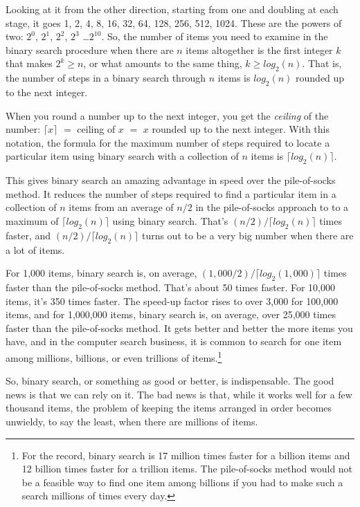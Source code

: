Looking at it from the other direction, starting from one
and doubling at each stage, it goes 1, 2, 4, 8, 16, 32, 64,
128, 256, 512, 1024. These are the powers of two:
$2^0$, $2^1$, $2^2$, $2^3$ \dots $2^{10}$.
So, the number of items you need to examine
in the binary search procedure
when there are $n$ items altogether is the
first integer $k$ that makes $2^k \geq n$, or
what amounts to the same thing, $k \geq log_2(n)$.
That is, the number of steps in a
binary search through
$n$ items is $log_2(n)$ rounded up
to the next integer.

When you round a number up to the next integer, you get the
\emph{ceiling}
of the number:
$\lceil x \rceil$ $=$ ceiling of $x$ $=$ $x$ rounded up to the next integer.
With this notation, the formula for the maximum number of steps
required to locate a particular item using
binary search with a collection of $n$ items
is $\lceil log_2(n) \rceil$.

This gives binary search an amazing
advantage in speed over the pile-of-socks method.
It reduces the number of steps required to find a particular item
in a collection of $n$ items from an average of $n/2$
in the pile-of-socks approach to
to a maximum of $\lceil log_2(n) \rceil$
using binary search.
That's $(n/2)/\lceil log_2(n) \rceil$ times faster,
and $(n/2)/\lceil log_2(n) \rceil$ turns
out to be a very big number when there are a lot of items.

For 1,000 items,
binary search is, on average,
$(1,000/2)/\lceil log_2(1,000) \rceil$ times faster than the pile-of-socks method.
That's about 50 times faster.
For 10,000 items, it's 350 times faster.
The speed-up factor rises to over 3,000 for 100,000 items,
and for 1,000,000 items, binary search is, on average,
over 25,000 times faster than the pile-of-socks method.
It gets better and better the more items you have,
and in the computer search business, it is common to search for one item among
millions, billions, or even trillions of items.\footnote{For the record,
binary search is 17 million times faster for a billion items
and 12 billion times faster for a trillion items.
The pile-of-socks method would not be a feasible way
to find one item among billions if you had to make such a search
millions of times every day.}

So, binary search, or something as good or better, is indispensable.
The good news is that we can rely on it.
The bad news is that, while it works
well for a few thousand items, the problem of
keeping the items arranged in order
becomes unwieldy, to say the least, when there are
millions of items.

